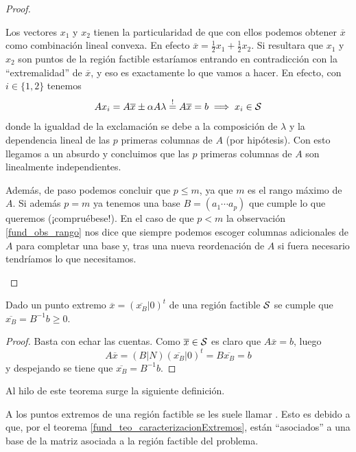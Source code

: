 \begin{proof}
\begin{itemize}
		Los vectores $x_1$ y $x_2$ tienen la particularidad de que con ellos podemos obtener $\overline{x}$ como combinación lineal convexa. En efecto $\overline{x}=\frac{1}{2}x_1+\frac{1}{2}x_2$. Si resultara que $x_1$ y $x_2$ son puntos de la región factible estaríamos entrando en contradicción con la ``extremalidad'' de $\overline{x}$, y eso es exactamente lo que vamos a hacer. En efecto, con $i\in\{1,2\}$ tenemos
		\begin{equation*}
			Ax_i=A\overline{x}\pm \alpha A\lambda\stackrel{!}{=}A\overline{x}=b\implies x_i\in\mathcal{S}
		\end{equation*}
		donde la igualdad de la exclamación se debe a la composición de $\lambda$ y la dependencia lineal de las $p$ primeras columnas de $A$ (por hipótesis). Con esto llegamos a un absurdo y concluimos que las $p$ primeras columnas de $A$ son linealmente independientes.
		
		Además, de paso podemos concluir que $p\leq m$, ya que $m$ es el rango máximo de $A$. Si además $p=m$ ya tenemos una base $B=(a_1\cdots a_p)$ que cumple lo que queremos (¡compruébese!). En el caso de que $p<m$ la observación \ref{fund_obs_rango} nos dice que siempre podemos escoger columnas adicionales de $A$ para completar una base y, tras una nueva reordenación de $A$ si fuera necesario tendríamos lo que necesitamos.\qedhere
	\end{itemize}
\end{proof}
\begin{cor}
	Dado un punto extremo $\overline{x}=(\overline{x_B}|0)^t$ de una región factible $\mathcal{S}$ se cumple que $\overline{x_B}=B^{-1}b\geq 0$.
\end{cor}
\begin{proof}
	Basta con echar las cuentas. Como $\overline{x}\in\mathcal{S}$ es claro que $A\overline{x}=b$, luego
	\begin{equation*}
		A\overline{x}=(B|N)(\overline{x_B}|0)^t=B\overline{x_B}=b
	\end{equation*}
	y despejando se tiene que $\overline{x_B}=B^{-1}b$.
\end{proof}
Al hilo de este teorema surge la siguiente definición.
\begin{defi}
	A los puntos extremos de una región factible se les suele llamar . Esto es debido a que, por el teorema \ref{fund_teo_caracterizacionExtremos}, están ``asociados'' a una base de la matriz asociada a la región factible del problema.
\end{defi}
